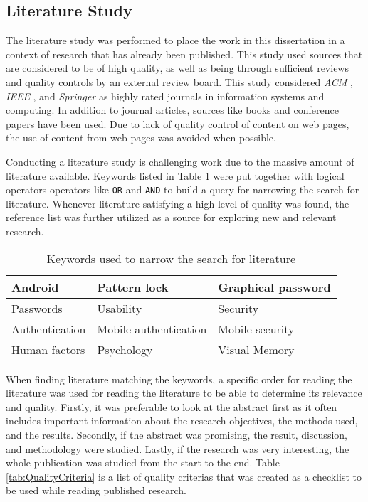     \subsection{Literature Study}\label{sec:methodliteraturereview}
      The literature study was performed to place the work in this dissertation in a context of research that has already been published. This study used sources that are considered to be of high quality, as well as being through sufficient reviews and quality controls by an external review board. This study considered {\it ACM} \cite{ACM}, {\it IEEE} \cite{IEEE}, and {\it Springer} \cite{Springer} as highly rated journals in information systems and computing. In addition to journal articles, sources like books and conference papers have been used. Due to lack of quality control of content on web pages, the use of content from web pages was avoided when possible.

      Conducting a literature study is challenging work due to the massive amount of literature available. Keywords listed in Table \ref{tab:keywords} were put together with logical operators operators like \texttt{OR} and \texttt{AND} to build a query for narrowing the search for literature. Whenever literature satisfying a high level of quality was found, the reference list was further utilized as a source for exploring new and relevant research. 

      \begin{table}[H]
          \centering
          \begin{tabular}{| l | l | l |}
            \hline
            Android & Pattern lock & Graphical password \\ \hline
            Passwords & Usability & Security \\ \hline
            Authentication & Mobile authentication & Mobile security \\ \hline
            Human factors & Psychology & Visual Memory \\ \hline
          \end{tabular}
          \caption{Keywords used to narrow the search for literature}
          \label{tab:keywords}
        \end{table}

      When finding literature matching the keywords, a specific order for reading the literature was used for reading the literature to be able to determine its relevance and quality. Firstly, it was preferable to look at the abstract first as it often includes important information about the research objectives, the methods used, and the results. Secondly, if the abstract was promising, the result, discussion, and methodology were studied. Lastly, if the research was very interesting, the whole publication was studied from the start to the end. Table \ref{tab:QualityCriteria} is a list of quality criterias that was created as a checklist to be used while reading published research.

